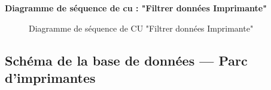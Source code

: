 \documentclass[a4paper,11pt]{report}
\begin{document}
\textbf{Diagramme de séquence de cu : "Filtrer données Imprimante" }
\begin{figure}[H]
  \centering
  \setlength{\fboxrule}{1pt}
  \setlength{\fboxsep}{3pt}
  \caption{Diagramme de séquence de CU "Filtrer données Imprimante"}
  \label{fig:clone-result}
\end{figure}



\setlength{\tabcolsep}{8pt}
\setlength{\extrarowheight}{2pt}


\newpage
\subsection{Schéma de la base de données — Parc d’imprimantes}
\end{document}
